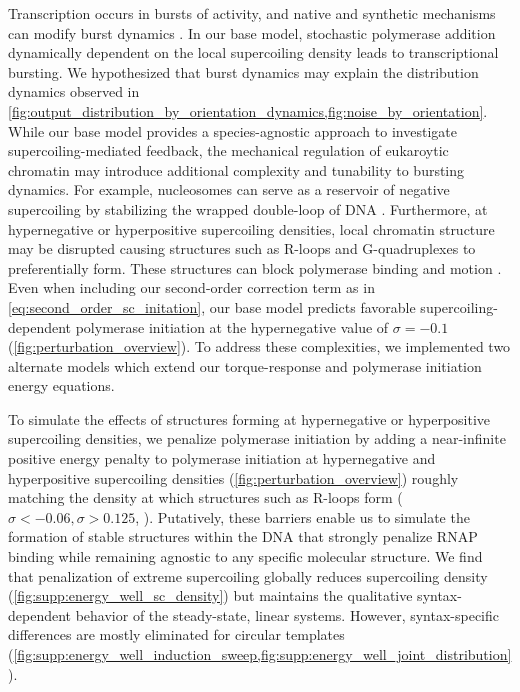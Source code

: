 \documentclass[11pt]{article}
\begin{document}
Transcription occurs in bursts of activity, and native and synthetic mechanisms can modify burst dynamics \parencite{desaiDNArepairPathwayCan2021,chongMechanismTranscriptionalBursting2014,poppAlteringTranscriptionFactor2021}.
In our base model, stochastic polymerase addition dynamically dependent on the local supercoiling density leads to transcriptional bursting. We hypothesized that burst dynamics may explain the distribution dynamics observed in \cref{fig:output_distribution_by_orientation_dynamics,fig:noise_by_orientation}. While our base model provides a species-agnostic approach to investigate supercoiling-mediated feedback, the mechanical regulation of eukaroytic chromatin may introduce additional complexity and tunability to bursting dynamics. For example, nucleosomes can serve as a reservoir of negative supercoiling by stabilizing the wrapped double-loop of DNA \parencite{leSynergisticCoordinationChromatin2019}. %
Furthermore, at hypernegative or hyperpositive supercoiling densities, local chromatin structure may be disrupted causing structures such as R-loops and G-quadruplexes to preferentially form. These structures can block polymerase binding and motion \parencite{stolzInterplayDNASequence2019}. %
Even when including our second-order correction term as in \cref{eq:second_order_sc_initation}, our base model predicts favorable supercoiling-dependent polymerase initiation at the hypernegative value of \(\sigma = -0.1\) (\cref{fig:perturbation_overview}). To address these complexities, we implemented two alternate models which extend our torque-response and polymerase initiation energy equations. 

To simulate the effects of structures forming at hypernegative or hyperpositive supercoiling densities, we penalize polymerase initiation by adding a near-infinite positive energy penalty to polymerase initiation at hypernegative and hyperpositive supercoiling densities (\cref{fig:perturbation_overview}) roughly matching the density at which structures such as R-loops form (\(\sigma < -0.06, \sigma > 0.125\), \parencite{stolzInterplayDNASequence2019}). Putatively, these barriers enable us to simulate the formation of stable structures within the DNA that strongly penalize RNAP binding while remaining agnostic to any specific molecular structure. We find that penalization of extreme supercoiling globally reduces supercoiling density (\cref{fig:supp:energy_well_sc_density}) but maintains the qualitative syntax-dependent behavior of the steady-state, linear systems. However, syntax-specific differences are mostly eliminated for circular templates (\cref{fig:supp:energy_well_induction_sweep,fig:supp:energy_well_joint_distribution}).
\end{document}
